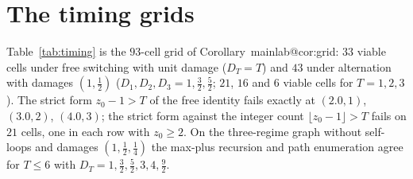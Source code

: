 \documentclass[11pt,a4paper]{article}
\makeatletter
\theoremstyle{plain}
\theoremstyle{definition}
\theoremstyle{remark}
\newcommand{\mref}[1]{\csname mainlab@#1\endcsname}
\makeatother
\begin{document}
\section{The timing grids}\label{si:timing}

Table~\ref{tab:timing} is the $93$-cell grid of Corollary~\mref{cor:grid}: $33$ viable cells under free switching with unit damage ($D_T=T$) and $43$ under alternation with damages $(1,\tfrac12)$ ($D_1,D_2,D_3=1,\tfrac32,\tfrac52$; $21$, $16$ and $6$ viable cells for $T=1,2,3$). The strict form $z_0-1>T$ of the free identity fails exactly at $(2.0,1)$, $(3.0,2)$, $(4.0,3)$; the strict form against the integer count $\lfloor z_0-1\rfloor>T$ fails on $21$ cells, one in each row with $z_0\ge 2$. On the three-regime graph without self-loops and damages $(1,\tfrac12,\tfrac14)$ the max-plus recursion and path enumeration agree for $T\le 6$ with $D_T=1,\tfrac32,\tfrac52,3,4,\tfrac92$.
\end{document}
